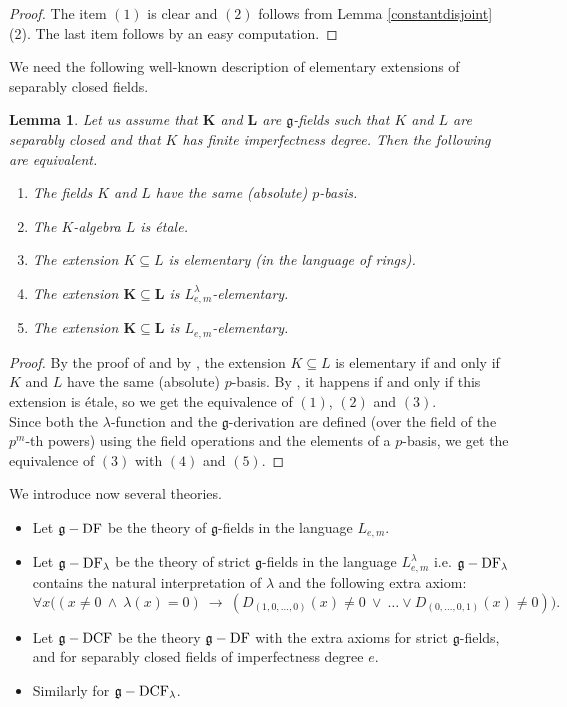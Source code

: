 \documentclass[10pt]{amsart}
\newtheorem{lemma}[theorem]{Lemma}
\theoremstyle{definition}
\begin{document}
\begin{proof}
The item $(1)$ is clear and $(2)$ follows from Lemma \ref{constantdisjoint}(2). The last item follows by an easy computation.
\end{proof}
\noindent
We need the following well-known description of elementary extensions of separably closed fields.
\begin{lemma}\label{elementaryetale}
Let us assume that $\mathbf{K}$ and $\mathbf{L}$ are $\mathfrak{g}$-fields such that $K$ and $L$ are separably closed and that $K$ has finite imperfectness degree. Then the following are equivalent.
\begin{enumerate}
\item The fields $K$ and $L$ have the same (absolute) $p$-basis.

\item The $K$-algebra $L$ is \'{e}tale.

\item The extension $K\subseteq L$ is elementary (in the language of rings).

\item The extension $\mathbf{K}\subseteq \mathbf{L}$ is $L^{\lambda}_{e,m}$-elementary.

\item The extension $\mathbf{K}\subseteq \mathbf{L}$ is $L_{e,m}$-elementary.
\end{enumerate}
\end{lemma}
\begin{proof}
By the proof of \cite[Theorem 2.1]{Del1} and by \cite[Claim 2.2]{Del1}, the extension $K\subseteq L$ is elementary if and only if $K$ and $L$ have the same (absolute) $p$-basis. By \cite[Theorem 26.7]{mat}, it happens if and only if this extension is \'{e}tale, so we get the equivalence of $(1)$, $(2)$ and $(3)$.
\\
Since both the $\lambda$-function and the $\mathfrak{g}$-derivation are defined (over the field of the $p^m$-th powers) using the field operations and the elements of a $p$-basis, we get the equivalence of $(3)$ with $(4)$ and $(5)$.
\end{proof}
\noindent
We introduce now several theories.
\begin{itemize}
\item Let $\mathfrak{g}-\operatorname{DF}$ be the theory of $\mathfrak{g}$-fields in the language $L_{e,m}$.

\item Let $\mathfrak{g}-\operatorname{DF}_{\lambda}$ be the theory of strict $\mathfrak{g}$-fields in the language $L_{e,m}^{\lambda}$ i.e. $\mathfrak{g}-\operatorname{DF}_{\lambda}$ contains the natural interpretation of $\lambda$ and the following extra axiom:
$$\forall x \Big((x\neq 0\ \wedge \ \lambda(x)=0)\ \rightarrow\ (D_{(1,0,\ldots,0)}(x)\neq 0\ \vee\ \ldots \vee D_{(0,\ldots,0,1)}(x)\neq 0)\Big).$$

\item Let $\mathfrak{g}-\operatorname{DCF}$ be the theory $\mathfrak{g}-\operatorname{DF}$ with the extra axioms for strict $\mathfrak{g}$-fields, and for separably closed fields of imperfectness degree $e$.

\item Similarly for $\mathfrak{g}-\operatorname{DCF}_{\lambda}$.
\end{itemize}
\end{document}
